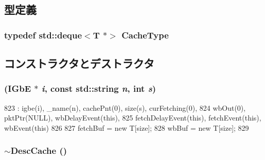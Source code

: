 \subsection{型定義}
\hypertarget{classIGbE_1_1DescCache_a1587fdc5fc2e56988bee51b7a035cd30}{
\subsubsection[{CacheType}]{\setlength{\rightskip}{0pt plus 5cm}typedef {\bf std::deque}$<$T $\ast$$>$ {\bf CacheType}}}
\label{classIGbE_1_1DescCache_a1587fdc5fc2e56988bee51b7a035cd30}


\subsection{コンストラクタとデストラクタ}
\hypertarget{classIGbE_1_1DescCache_a5d52519add3740ad26acef908669a09f}{
\subsubsection[{DescCache}]{ ({\bf IGbE} $\ast$ {\em i}, \/  const std::string {\em n}, \/  int {\em s})}}
\label{classIGbE_1_1DescCache_a5d52519add3740ad26acef908669a09f}



\begin{DoxyCode}
823     : igbe(i), _name(n), cachePnt(0), size(s), curFetching(0),
824       wbOut(0), pktPtr(NULL), wbDelayEvent(this),
825       fetchDelayEvent(this), fetchEvent(this), wbEvent(this)
826 {
827     fetchBuf = new T[size];
828     wbBuf = new T[size];
829 }
\end{DoxyCode}
\hypertarget{classIGbE_1_1DescCache_a386ef53292372f92559f7d22782dfa76}{
\subsubsection[{$\sim$DescCache}]{\setlength{\rightskip}{0pt plus 5cm}$\sim${\bf DescCache} ()}}
\label{classIGbE_1_1DescCache_a386ef53292372f92559f7d22782dfa76}



